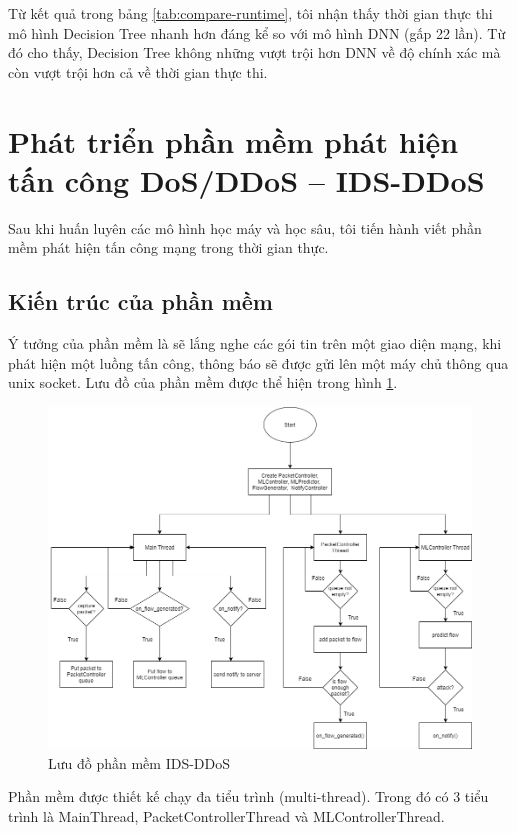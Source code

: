 Từ kết quả trong bảng \ref{tab:compare-runtime}, tôi nhận thấy thời gian thực thi mô hình Decision Tree nhanh hơn đáng kể so với mô hình DNN (gấp 22 lần). Từ đó cho thấy, Decision Tree không những vượt trội hơn DNN về độ chính xác mà còn vượt trội hơn cả về thời gian thực thi.

\section{Phát triển phần mềm phát hiện tấn công DoS/DDoS – IDS-DDoS}

Sau khi huấn luyên các mô hình học máy và học sâu, tôi tiến hành viết phần mềm phát hiện tấn công mạng trong thời gian thực.

\subsection{Kiến trúc của phần mềm}

Ý tưởng của phần mềm là sẽ lắng nghe các gói tin trên một giao diện mạng, khi phát hiện một luồng tấn công, thông báo sẽ được gửi lên một máy chủ thông qua unix socket. Lưu đồ của phần mềm được thể hiện trong hình \ref{fig:ids-software}.

\begin{figure}[ht!]
	\includegraphics[width=\linewidth]{fig/ids-software.png}
	\caption{Lưu đồ phần mềm IDS-DDoS}
	\label{fig:ids-software}
\end{figure}

Phần mềm được thiết kế chạy đa tiểu trình (multi-thread). Trong đó có 3 tiểu trình là MainThread, PacketControllerThread và MLControllerThread.

